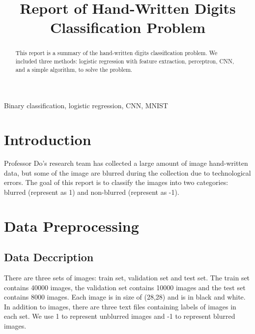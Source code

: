 \documentclass[conference]{IEEEtran}
\begin{document}
\title{Report of Hand-Written Digits Classification Problem\\
}

\author{
}

\maketitle

\begin{abstract}
This report is a summary of the hand-written digits classification problem. We included three methods: logistic regression with feature extraction,
perceptron, CNN, and a simple algorithm, to solve the problem.
\end{abstract}

\begin{IEEEkeywords}
Binary classification, logistic regression, CNN, MNIST
\end{IEEEkeywords}

\section{Introduction}
Professor Do's research team has collected a large amount of image hand-written data, but some of the image are blurred
during the collection due to technological errors. The goal of this report is to classify the images into two categories:
blurred (represent as 1) and non-blurred (represent as -1). 

\section{Data Preprocessing}

\subsection{Data Deccription}

There are three sets of images: train set, validation set and test set. The train set contains 40000 images, the validation set 
contains 10000 images and the test set contains 8000 images. Each image is in size of (28,28) and is in black and white. In addition to
images, there are three text files containing labels of images in each set. We use 1 to represent unblurred images and -1 to represent blurred images.
\end{document}
